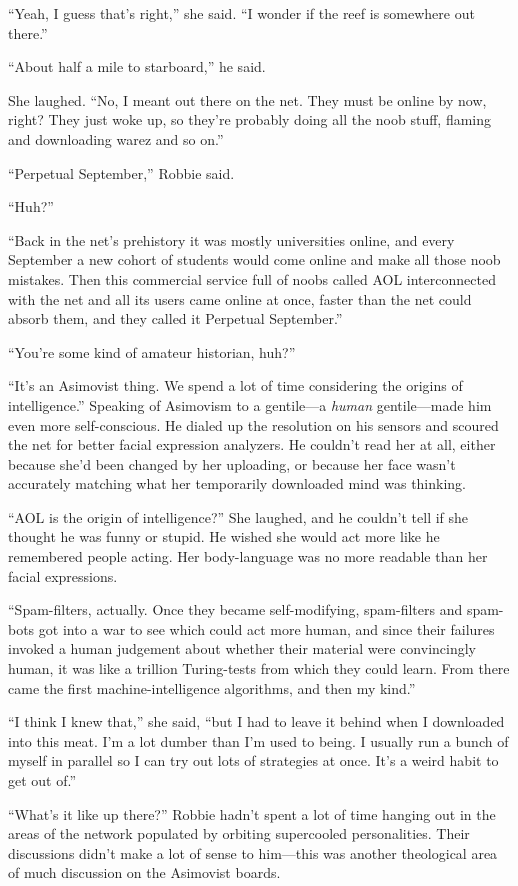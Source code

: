 “Yeah, I guess that’s right,” she said. “I wonder if the reef is
somewhere out there.”

“About half a mile to starboard,” he said.

She laughed. “No, I meant out there on the net. They must be online
by now, right? They just woke up, so they’re probably doing all the
noob stuff, flaming and downloading warez and so on.”

“Perpetual September,” Robbie said.

“Huh?”

“Back in the net’s prehistory it was mostly universities online,
and every September a new cohort of students would come online and
make all those noob mistakes. Then this commercial service full of
noobs called AOL interconnected with the net and all its users came
online at once, faster than the net could absorb them, and they
called it Perpetual September.”

“You’re some kind of amateur historian, huh?”

“It’s an Asimovist thing. We spend a lot of time considering the
origins of intelligence.” Speaking of Asimovism to a gentile—a
\emph{human} gentile—made him even more self-conscious. He dialed
up the resolution on his sensors and scoured the net for better
facial expression analyzers. He couldn’t read her at all, either
because she’d been changed by her uploading, or because her face
wasn’t accurately matching what her temporarily downloaded mind was
thinking.

“AOL is the origin of intelligence?” She laughed, and he couldn’t
tell if she thought he was funny or stupid. He wished she would act
more like he remembered people acting. Her body-language was no
more readable than her facial expressions.

“Spam-filters, actually. Once they became self-modifying,
spam-filters and spam-bots got into a war to see which could act
more human, and since their failures invoked a human judgement
about whether their material were convincingly human, it was like a
trillion Turing-tests from which they could learn. From there came
the first machine-intelligence algorithms, and then my kind.”

“I think I knew that,” she said, “but I had to leave it behind when
I downloaded into this meat. I’m a lot dumber than I’m used to
being. I usually run a bunch of myself in parallel so I can try out
lots of strategies at once. It’s a weird habit to get out of.”

“What’s it like up there?” Robbie hadn’t spent a lot of time
hanging out in the areas of the network populated by orbiting
supercooled personalities. Their discussions didn’t make a lot of
sense to him—this was another theological area of much discussion
on the Asimovist boards.

